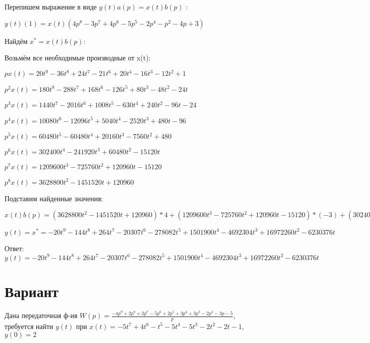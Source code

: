 \documentclass{article}
\begin{document}
{{{{{Перепишем выражение в виде $y(t)a(p)=x(t)b(p)$ :

$y(t)(1)=x(t)(4p^{8}-3p^{7}+4p^{6}-5p^{5}-2p^{4}-p^{2}-4p+3)$

Найдём $x^*=x(t)b(p)$:

Возьмём все необходимые производные от x(t):

$px(t)=20t^{9}-36t^{8}+24t^{7}-21t^{6}+20t^{4}-16t^{3}-12t^{2}+1$

$p^2x(t)=180t^{8}-288t^{7}+168t^{6}-126t^{5}+80t^{3}-48t^{2}-24t$

$p^3x(t)=1440t^{7}-2016t^{6}+1008t^{5}-630t^{4}+240t^{2}-96t-24$

$p^4x(t)=10080t^{6}-12096t^{5}+5040t^{4}-2520t^{3}+480t-96$

$p^5x(t)=60480t^{5}-60480t^{4}+20160t^{3}-7560t^{2}+480$

$p^6x(t)=302400t^{4}-241920t^{3}+60480t^{2}-15120t$

$p^7x(t)=1209600t^{3}-725760t^{2}+120960t-15120$

$p^8x(t)=3628800t^{2}-1451520t+120960$

Подставим найденные значения:

$x(t)b(p) = (3628800t^{2}-1451520t+120960)*4+(1209600t^{3}-725760t^{2}+120960t-15120)*(-3)+(302400t^{4}-241920t^{3}+60480t^{2}-15120t)*4+(60480t^{5}-60480t^{4}+20160t^{3}-7560t^{2}+480)*(-5)+(10080t^{6}-12096t^{5}+5040t^{4}-2520t^{3}+480t-96)*(-2)+(180t^{8}-288t^{7}+168t^{6}-126t^{5}+80t^{3}-48t^{2}-24t)*(-1)+(20t^{9}-36t^{8}+24t^{7}-21t^{6}+20t^{4}-16t^{3}-12t^{2}+1)*(-4)+(20t^{9}-36t^{8}+24t^{7}-21t^{6}+20t^{4}-16t^{3}-12t^{2}+1)*3=-20t^{9}-144t^{8}+264t^{7}-20307t^{6}-278082t^{5}+1501900t^{4}-4692304t^{3}+16972260t^{2}-6230376t$





$y(t)=x^*=-20t^{9}-144t^{8}+264t^{7}-20307t^{6}-278082t^{5}+1501900t^{4}-4692304t^{3}+16972260t^{2}-6230376t$

Ответ: $y(t) = -20t^{9}-144t^{8}+264t^{7}-20307t^{6}-278082t^{5}+1501900t^{4}-4692304t^{3}+16972260t^{2}-6230376t$

\section{Вариант}

Дана передаточная ф-ия $W(p)=\frac{-4p^{9}+2p^{8}+2p^{7}-5p^{6}+2p^{5}+3p^{4}+3p^{3}-2p^{2}-3p-5}{p}$, требуется найти $y(t)$ при $x(t)=-5t^{7}+4t^{6}-t^{5}-5t^{4}-5t^{3}-2t^{2}-2t-1$, $y(0)=2$

}}}}}
\end{document}
